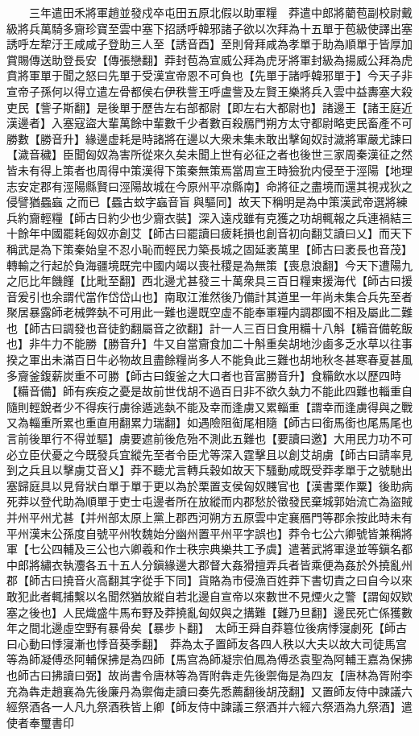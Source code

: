 　　三年遣田禾將軍趙並發戍卒屯田五原北假以助軍糧　莽遣中郎將藺苞副校尉戴級將兵萬騎多齎珍寶至雲中塞下招誘呼韓邪諸子欲以次拜為十五單于苞級使譯出塞誘呼左犂汙王咸咸子登助三人至【誘音酉】至則脅拜咸為孝單于助為順單于皆厚加賞賜傳送助登長安【傳張戀翻】莽封苞為宣威公拜為虎牙將軍封級為揚威公拜為虎賁將軍單于聞之怒曰先單于受漢宣帝恩不可負也【先單于諸呼韓邪單于】今天子非宣帝子孫何以得立遣左骨都侯右伊秩訾王呼盧訾及左賢王樂將兵入雲中益夀塞大殺吏民【訾子斯翻】是後單于歷告左右部都尉【即左右大都尉也】諸邊王【諸王庭近漢邊者】入塞寇盜大輩萬餘中輩數千少者數百殺鴈門朔方太守都尉略吏民畜產不可勝數【勝音升】緣邊虚耗是時諸將在邊以大衆未集未敢出擊匈奴討濊將軍嚴尤諫曰【濊音穢】臣聞匈奴為害所從來久矣未聞上世有必征之者也後世三家周秦漢征之然皆未有得上策者也周得中策漢得下策秦無策焉當周宣王時獫狁内侵至于涇陽【地理志安定郡有涇陽縣賢曰涇陽故城在今原州平凉縣南】命將征之盡境而還其視戎狄之侵譬猶蟁蝱之而已【蟁古蚊字蝱音盲與驅同】故天下稱明是為中策漢武帝選將練兵約齎輕糧【師古日約少也少齎衣裝】深入遠戍雖有克獲之功胡輒報之兵連禍結三十餘年中國罷耗匈奴亦創艾【師古曰罷讀曰疲耗損也創音初向翻艾讀曰乂】而天下稱武是為下策秦始皇不忍小恥而輕民力築長城之固延袤萬里【師古曰袤長也音茂】轉輸之行起於負海疆境既完中國内竭以喪社稷是為無策【喪息浪翻】今天下遭陽九之厄比年饑饉【比毗至翻】西北邊尤甚發三十萬衆具三百日糧東援海代【師古曰援音爰引也余謂代當作岱岱山也】南取江淮然後乃備計其道里一年尚未集合兵先至者聚居暴露師老械弊埶不可用此一難也邊既空虛不能奉軍糧内調郡國不相及屬此二難也【師古曰調發也音徒釣翻屬音之欲翻】計一人三百日食用糒十八斛【糒音備乾飯也】非牛力不能勝【勝音升】牛又自當齎食加二十斛重矣胡地沙鹵多乏水草以往事揆之軍出未滿百日牛必物故且盡餘糧尚多人不能負此三難也胡地秋冬甚寒春夏甚風多齎釜鍑薪炭重不可勝【師古曰鍑釜之大口者也音富勝音升】食糒飲水以歷四時【糒音備】師有疾疫之憂是故前世伐胡不過百日非不欲久埶力不能此四難也輜重自隨則輕銳者少不得疾行虜徐遁逃埶不能及幸而逢虜又累輜重【謂幸而逢虜得與之戰又為輜重所累也重直用翻累力瑞翻】如遇險阻䘖尾相隨【師古曰銜馬銜也尾馬尾也言前後單行不得並驅】虜要遮前後危殆不測此五難也【要讀曰邀】大用民力功不可必立臣伏憂之今既發兵宜縱先至者令臣尤等深入霆擊且以創艾胡虜【師古曰請率見到之兵且以擊虜艾音乂】莽不聽尤言轉兵穀如故天下騷動咸既受莽孝單于之號馳出塞歸庭具以見脅狀白單于單于更以為於栗置支侯匈奴賤官也【漢書栗作粟】後助病死莽以登代助為順單于吏士屯邊者所在放縱而内郡愁於徵發民棄城郭始流亡為盜賊并州平州尤甚【并州部太原上黨上郡西河朔方五原雲中定襄鴈門等郡余按此時未有平州漢末公孫度自號平州牧魏始分幽州置平州平字誤也】莽令七公六卿號皆兼稱將軍【七公四輔及三公也六卿羲和作士秩宗典樂共工予虞】遣著武將軍逯並等鎭名都中郎將繡衣執灋各五十五人分鎭緣邊大郡督大姦猾擅弄兵者皆乘便為姦於外撓亂州郡【師古曰撓音火高翻其字從手下同】貨賂為市侵漁百姓莽下書切責之曰自今以來敢犯此者輒捕繫以名聞然猶放縱自若北邊自宣帝以來數世不見煙火之警【謂匈奴欵塞之後也】人民熾盛牛馬布野及莽撓亂匈奴與之搆難【難乃旦翻】邊民死亡係獲數年之間北邊虛空野有暴骨矣【暴步卜翻】　太師王舜自莽簒位後病悸寖劇死【師古曰心動曰悸寖漸也悸音葵季翻】　莽為太子置師友各四人秩以大夫以故大司徒馬宫等為師凝傅丞阿輔保拂是為四師【馬宫為師凝宗伯鳳為傅丞袁聖為阿輔王嘉為保拂也師古曰拂讀曰弼】故尚書令唐林等為胥附犇走先後禦侮是為四友【唐林為胥附李充為犇走趙襄為先後廉丹為禦侮走讀曰奏先悉薦翻後胡茂翻】又置師友侍中諫議六經祭酒各一人凡九祭酒秩皆上卿【師友侍中諫議三祭酒并六經六祭酒為九祭酒】遣使者奉璽書印